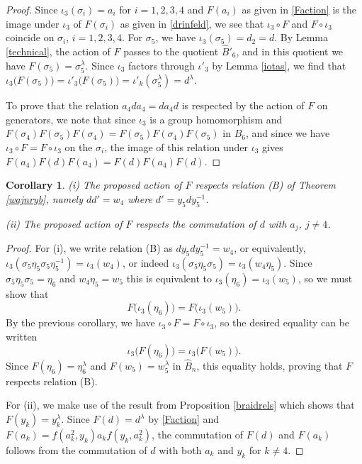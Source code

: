\documentclass[a4paper,10pt,reqno]{amsart}
\newcommand\B{\widehat{B}}
\newtheorem{cor}[thm]{Corollary}
\begin{document}
\begin{proof}

 Since $\iota_3(\sigma_i)=a_i$ for $i=1,2,3,4$ and
$F(a_i)$ as given in \eqref{Faction} is the image under
$\iota_3$ of $F(\sigma_i)$ as given in \eqref{drinfeld}, we see that
$\iota_3\circ F$ and $F\circ \iota_3$ coincide on $\sigma_i$, $i=1,2,3,4$.  
For $\sigma_5$, we have $\iota_3(\sigma_5)=d_2=d$. By Lemma \ref{technical},
the action of $F$ passes to the quotient $\B'_6$, and in this quotient
we have $F(\sigma_5)=\sigma_5^\lambda$. Since $\iota_3$ factors
through $\iota'_3$ by Lemma \ref{iotas}, we find that
$\iota_3\bigl(F(\sigma_5)\bigr)=\iota'_3\bigl(F(\sigma_5)\bigr)
=\iota'_k(\sigma_5^\lambda)=d^\lambda$. 

To prove that the relation $a_4da_4=da_4d$ is respected by the action of $F$
on generators, we note that since $\iota_3$ is a group homomorphism and 
$F(\sigma_4)F(\sigma_5)F(\sigma_4)=F(\sigma_5)F(\sigma_4)F(\sigma_5)$ in $\B_6$,
and since we have $\iota_3\circ F=F\circ \iota_3$ on the $\sigma_i$, the 
image of this relation under $\iota_3$ gives $F(a_4)F(d)F(a_4)=F(d)F(a_4)F(d)$.
\end{proof}

\begin{cor}\label{relationB}
(i) The proposed action of $F$ respects relation (B) of
Theorem \ref{wajnryb}, namely $dd'=w_4$ where $d'=y_5dy_5^{-1}$.

\noindent (ii) The proposed action of $F$ respects the commutation of $d$ with $a_j$, $j\ne 4$.
\end{cor}
\begin{proof}
For (i), we write relation (B) as $dy_5dy_5^{-1}=w_4$, or equivalently,
$\iota_3(\sigma_5\eta_5\sigma_5\eta_5^{-1})=\iota_3(w_4)$,
or indeed $\iota_3(\sigma_5\eta_5\sigma_5)=\iota_3(w_4\eta_5)$.
Since $\sigma_5\eta_5\sigma_5=\eta_6$ and $w_4\eta_5=w_5$ this is equivalent to
$\iota_3(\eta_6)=\iota_3(w_5)$, so we must show that 
$$F\bigl(\iota_3(\eta_6)\bigr)=F\bigl(\iota_3(w_5)\bigr).$$ 
By the previous corollary, we have
$\iota_3\circ F=F\circ \iota_3$, so the desired equality can be written
$$\iota_3\bigl(F(\eta_6)\bigr)=\iota_3\bigl(F(w_5)\bigr).$$
Since $F(\eta_6)=\eta_6^\lambda$ and $F(w_5)=w_5^\lambda$ in $\B_n$, this equality holds,
proving that $F$ respects relation (B).

For (ii), we make use of the result from Proposition \ref{braidrels} which 
shows that $F(y_k)=y_k^\lambda$. Since $F(d)=d^\lambda$ by \eqref{Faction}
and $F(a_k)=f(a_k^2,y_k)a_kf(y_k,a_k^2)$, the commutation of $F(d)$ and $F(a_k)$
follows from the commutation of $d$ with both $a_k$ and $y_k$ for $k\ne 4$.
\end{proof}
\end{document}
